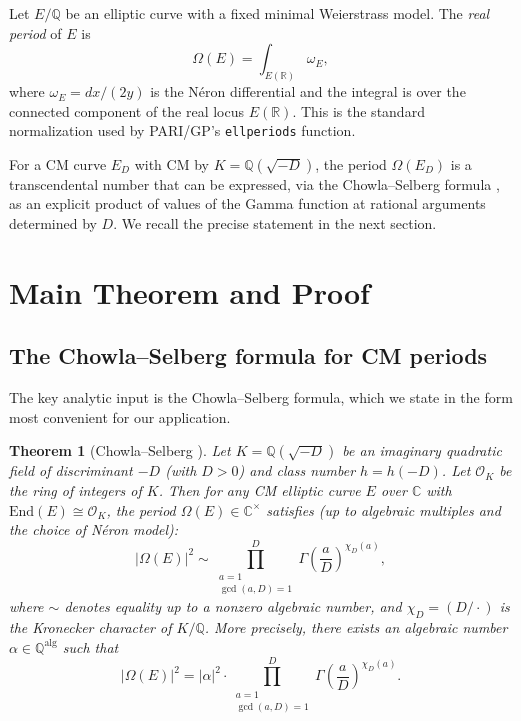\documentclass[12pt,a4paper]{article}
\theoremstyle{plain}
\newtheorem{theorem}{Theorem}[section]
\theoremstyle{definition}
\newcommand{\Q}{\mathbb{Q}}
\newcommand{\C}{\mathbb{C}}
\newcommand{\R}{\mathbb{R}}
\newcommand{\OK}{\mathcal{O}_K}
\newcommand{\End}{\mathrm{End}}
\begin{document}
Let $E/\Q$ be an elliptic curve with a fixed minimal Weierstrass model.
The \emph{real period} of $E$ is
\[
  \Omega(E) = \int_{E(\R)} \omega_E,
\]
where $\omega_E = dx/(2y)$ is the N\'eron differential and the integral is
over the connected component of the real locus $E(\R)$.  This is the standard
normalization used by PARI/GP's \texttt{ellperiods} function.

For a CM curve $E_D$ with CM by $K = \Q(\sqrt{-D})$, the period $\Omega(E_D)$
is a transcendental number that can be expressed, via the Chowla--Selberg
formula \cite{ChowlaSelberg1949}, as an explicit product of
values of the Gamma function at rational arguments determined by $D$.  We
recall the precise statement in the next section.

\section{Main Theorem and Proof}
\label{sec:maintheorem}

\subsection{The Chowla--Selberg formula for CM periods}

The key analytic input is the Chowla--Selberg formula, which we state in
the form most convenient for our application.

\begin{theorem}[Chowla--Selberg \cite{ChowlaSelberg1949}]
\label{thm:CS}
Let $K = \Q(\sqrt{-D})$ be an imaginary quadratic field of discriminant $-D$
(with $D > 0$) and class number $h = h(-D)$.  Let $\OK$ be the ring of
integers of $K$.  Then for any CM elliptic curve $E$ over $\C$ with
$\End(E) \cong \OK$, the period $\Omega(E) \in \C^\times$ satisfies (up to
algebraic multiples and the choice of N\'eron model):
\[
  |\Omega(E)|^2 \sim
    \prod_{\substack{a=1 \\ \gcd(a, D) = 1}}^{D}
    \Gamma\!\left(\frac{a}{D}\right)^{\chi_D(a)},
\]
where $\sim$ denotes equality up to a nonzero algebraic number, and
$\chi_D = (D/\cdot)$ is the Kronecker character of $K/\Q$.
More precisely, there exists an algebraic number $\alpha \in \Q^{\mathrm{alg}}$
such that
\[
  |\Omega(E)|^2 = |\alpha|^2 \cdot
    \prod_{\substack{a=1 \\ \gcd(a, D) = 1}}^{D}
    \Gamma\!\left(\frac{a}{D}\right)^{\chi_D(a)}.
\]
\end{theorem}
\end{document}
